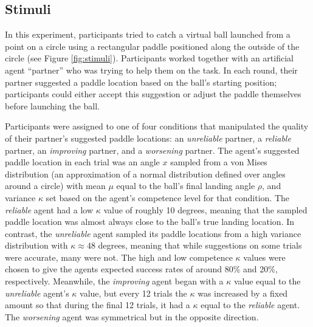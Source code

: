 \documentclass[10pt,letterpaper]{article}
\begin{document}
\subsection{Stimuli}

In this experiment, participants tried to catch a virtual ball launched from a point on a circle using a rectangular paddle positioned along the outside of the circle (see Figure \ref{fig:stimuli}).\footnotemark{} 
Participants worked together with an artificial agent ``partner'' who was trying to help them on the task. In each round, their partner suggested a paddle location based on the ball's starting position; participants could either accept this suggestion or adjust the paddle themselves before launching the ball.


Participants were assigned to one of four conditions that manipulated the quality of their partner's suggested paddle locations: an \textit{unreliable} partner, a \textit{reliable} partner, an \textit{improving} partner, and a \textit{worsening} partner. The agent's
suggested paddle location in each trial was an angle $x$ sampled from a von Mises distribution (an approximation of a normal distribution defined over angles around a circle) with mean $\mu$ equal to the ball's final landing angle $\rho$, and variance $\kappa$ set based on the agent's competence level for that condition. The \textit{reliable} agent had a low $\kappa$ value of roughly 10 degrees, meaning that the sampled paddle location was almost always close to the ball's true landing location. In contrast, the \textit{unreliable} agent sampled its paddle locations from a high variance distribution with $\kappa \approx 48$ degrees, meaning that while suggestions on some trials were accurate, many were not. The high and low competence $\kappa$ values were chosen to give the agents expected success rates of around 80\% and 20\%, respectively. Meanwhile, the \textit{improving} agent began with a $\kappa$ value equal to the \textit{unreliable} agent's $\kappa$ value, but every 12 trials the $\kappa$ was increased by a fixed amount so that during the final 12 trials, it had a $\kappa$ equal to the \textit{reliable} agent. The \textit{worsening} agent was symmetrical but in the opposite direction.
\end{document}
